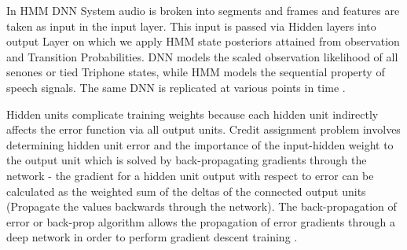 In HMM DNN System audio is broken into segments and frames and features are taken as input in the input layer. This input is passed via Hidden layers into output Layer on which we apply HMM state posteriors attained from observation and Transition Probabilities. DNN models the scaled observation likelihood of all senones or tied Triphone states, while HMM models the sequential property of speech signals. The same DNN is replicated at various points in time \cite{hussein_arabic_2022}.

Hidden units complicate training weights because each hidden unit indirectly affects the error function via all output units. Credit assignment problem 
involves determining hidden unit error and the importance of the input-hidden weight to the output unit which is solved by back-propagating gradients through the network - the gradient for a hidden unit output with respect to error can be calculated as the weighted sum of the deltas of the connected output units (Propagate the values backwards through the network). The back-propagation of error or back-prop algorithm allows the propagation of error gradients through a deep network in order to perform gradient descent training \cite{dahl_context-dependent_2012}.



